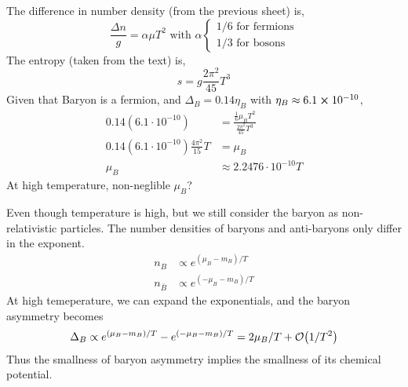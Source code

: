 \begin{enumerate}[label=\alph*)]
	The difference in number density (from the previous sheet) is,
	\begin{equation}
	\frac{\Delta n }{g} = \alpha \mu T^2 \text{ with } \alpha \begin{cases} 1/6 \text{ for fermions} \\ 1/3 \text{ for bosons} \end{cases}
	\end{equation}
	The entropy (taken from the text) is,
	\begin{equation}
	s = g \frac{2\pi^2}{45}T^3
	\end{equation}
	Given that Baryon is a fermion, and $\Delta_B = 0.14 \eta_B$ with $\eta_B \approx 6.1 \cross 10^{-10}$,
	\begin{align*}
	0.14 (6.1 \cdot 10^{-10} ) &= \frac{ \frac{1}{6} \mu_B T^2}{\frac{2\pi^2}{45}T^3} \\
	0.14 (6.1 \cdot 10^{-10}) \frac{4\pi^2}{15}T	&= \mu_B \\
	\mu_B &\approx 2.2476 \cdot 10^{-10} T
	\end{align*}
	At high temperature, non-neglible $\mu_B$?

   Even though temperature is high, but we still consider the baryon as non-relativistic particles. The number densities of baryons and anti-baryons only differ in the exponent.
   \begin{align*}
      n_B &\propto e^{(\mu_B - m_B)/T}\\
      n_\bar B &\propto e^{(-\mu_B - m_B)/T}
   \end{align*}
   At high temeperature, we can expand the exponentials, and the baryon asymmetry becomes
   \begin{align}
      \Delta_B \propto e^{(\mu_B - m_B)/T} - e^{(-\mu_B - m_B)/T} = 2\mu_B / T  + \order{1/T^2}
   \end{align}
   Thus the smallness of baryon asymmetry implies the smallness of its chemical potential.
\end{enumerate}
